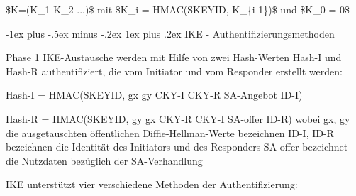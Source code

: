 \documentclass[a4paper]{article}
\makeatletter
\renewcommand{\subsubsection}{\@startsection{subsubsection}{3}{0mm}%
 {-1ex plus -.5ex minus -.2ex}%
 {1ex plus .2ex}%
 {\normalfont\small\bfseries}}
\makeatother
\begin{document}
\begin{multicols}{3}
\begin{itemize*}
\begin{itemize*}
                  \begin{itemize*}
                        \item \$K=(K\_1 \textbar{} K\_2 \textbar{} ...)\$ mit \$K\_i = HMAC(SKEYID, K\_\{i-1\})\$ und \$K\_0 = 0\$
                  \end{itemize*}
            \end{itemize*}


            \subsubsection{IKE -
                  Authentifizierungsmethoden}

            \begin{itemize*}
                  \item
                  Phase 1 IKE-Austausche werden mit Hilfe von zwei Hash-Werten Hash-I
                  und Hash-R authentifiziert, die vom Initiator und vom Responder
                  erstellt werden:

                  \begin{itemize*}
                        \item Hash-I = HMAC(SKEYID, gx \textbar{} gy \textbar{} CKY-I \textbar{} CKY-R \textbar{} SA-Angebot \textbar{} ID-I)
                        \item Hash-R = HMAC(SKEYID, gy \textbar{} gx \textbar{} CKY-R \textbar{} CKY-I \textbar{} SA-offer \textbar{} ID-R) wobei gx, gy die ausgetauschten öffentlichen Diffie-Hellman-Werte bezeichnen ID-I, ID-R bezeichnen die Identität des Initiators und des Responders SA-offer bezeichnet die Nutzdaten bezüglich der SA-Verhandlung
                  \end{itemize*}
                  \item
                  IKE unterstützt vier verschiedene Methoden der Authentifizierung:


\end{itemize*}
\end{itemize*}
\end{multicols}
\end{document}

